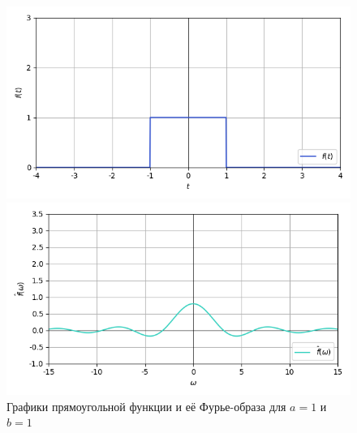\documentclass[a4paper]{article}
\begin{document}
\begin{figure}[H]
    \begin{minipage}{0.5\textwidth}
        \centering \includegraphics[width=\textwidth]{sources/1_rectangular/graph_1.png}
    \end{minipage}\hfill
    \begin{minipage}{0.5\textwidth}
        \centering \includegraphics[width=\textwidth]{sources/1_rectangular/fourier_1.png}
    \end{minipage}
    \caption{Графики прямоугольной функции и её Фурье-образа для $a = 1$ и $b = 1$} 
\end{figure}
\end{document}
